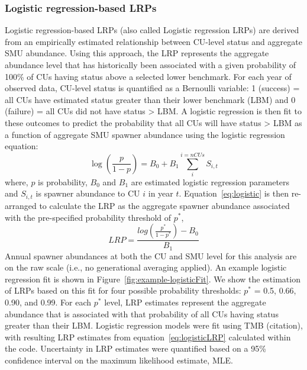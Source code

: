 \documentclass[11pt]{book}
\begin{document}
\hypertarget{logisticMethods}{%
\subsubsection{Logistic regression-based LRPs}\label{logisticMethods}}

Logistic regression-based LRPs (also called Logistic regression LRPs) are derived from an empirically estimated relationship between CU-level status and aggregate SMU abundance. Using this approach, the LRP represents the aggregate abundance level that has historically been associated with a given probability of 100\% of CUs having status above a selected lower benchmark. For each year of observed data, CU-level status is quantified as a Bernoulli variable: 1 (success) = all CUs have estimated status greater than their lower benchmark (LBM) and 0 (failure) = all CUs did not have status \textgreater{} LBM. A logistic regression is then fit to these outcomes to predict the probability that all CUs will have status \textgreater{} LBM as a function of aggregate SMU spawner abundance using the logistic regression equation:
\begin{equation}
  \log(\frac{p}{1-p}) = B_0 + B_1 \sum_{i}^{i=nCUs} S_{i,t}
   \label{eq:logistic}
\end{equation}
where, \(p\) is probability, \(B_0\) and \(B_1\) are estimated logistic regression parameters and \(S_{i,t}\) is spawner abundance to CU \(i\) in year \(t\). Equation~\ref{eq:logistic} is then re-arranged to calculate the LRP as the aggregate spawner abundance associated with the pre-specified probability threshold of \(p^*\),
\begin{equation}
  LRP = \frac{log(\frac{p^*}{1-p^*}) - B_0}{B_1}
  \label{eq:logisticLRP}
\end{equation}
Annual spawner abundances at both the CU and SMU level for this analysis are on the raw scale (i.e., no generational averaging applied). An example logistic regression fit is shown in Figure~\ref{fig:example-logisticFit}. We show the estimation of LRPs based on this fit for four possible probability thresholds: \(p^*\) = 0.5, 0.66, 0.90, and 0.99. For each \(p^*\) level, LRP estimates represent the aggregate abundance that is associated with that probability of all CUs having status greater than their LBM. Logistic regression models were fit using TMB (citation), with resulting LRP estimates from equation~\ref{eq:logisticLRP} calculated within the code. Uncertainty in LRP estimates were quantified based on a 95\% confidence interval on the maximum likelihood estimate, MLE.
\end{document}
